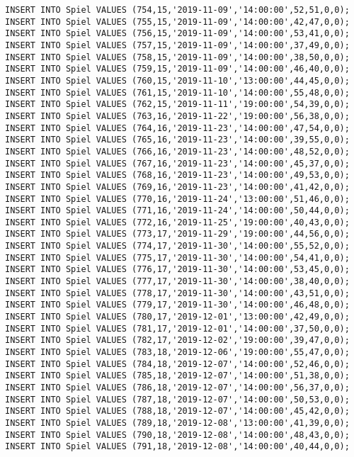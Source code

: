 \documentclass{lehramt-informatik-aufgabe}
\begin{document}
\begin{verbatim}
INSERT INTO Spiel VALUES (754,15,'2019-11-09','14:00:00',52,51,0,0);
INSERT INTO Spiel VALUES (755,15,'2019-11-09','14:00:00',42,47,0,0);
INSERT INTO Spiel VALUES (756,15,'2019-11-09','14:00:00',53,41,0,0);
INSERT INTO Spiel VALUES (757,15,'2019-11-09','14:00:00',37,49,0,0);
INSERT INTO Spiel VALUES (758,15,'2019-11-09','14:00:00',38,50,0,0);
INSERT INTO Spiel VALUES (759,15,'2019-11-09','14:00:00',46,40,0,0);
INSERT INTO Spiel VALUES (760,15,'2019-11-10','13:00:00',44,45,0,0);
INSERT INTO Spiel VALUES (761,15,'2019-11-10','14:00:00',55,48,0,0);
INSERT INTO Spiel VALUES (762,15,'2019-11-11','19:00:00',54,39,0,0);
INSERT INTO Spiel VALUES (763,16,'2019-11-22','19:00:00',56,38,0,0);
INSERT INTO Spiel VALUES (764,16,'2019-11-23','14:00:00',47,54,0,0);
INSERT INTO Spiel VALUES (765,16,'2019-11-23','14:00:00',39,55,0,0);
INSERT INTO Spiel VALUES (766,16,'2019-11-23','14:00:00',48,52,0,0);
INSERT INTO Spiel VALUES (767,16,'2019-11-23','14:00:00',45,37,0,0);
INSERT INTO Spiel VALUES (768,16,'2019-11-23','14:00:00',49,53,0,0);
INSERT INTO Spiel VALUES (769,16,'2019-11-23','14:00:00',41,42,0,0);
INSERT INTO Spiel VALUES (770,16,'2019-11-24','13:00:00',51,46,0,0);
INSERT INTO Spiel VALUES (771,16,'2019-11-24','14:00:00',50,44,0,0);
INSERT INTO Spiel VALUES (772,16,'2019-11-25','19:00:00',40,43,0,0);
INSERT INTO Spiel VALUES (773,17,'2019-11-29','19:00:00',44,56,0,0);
INSERT INTO Spiel VALUES (774,17,'2019-11-30','14:00:00',55,52,0,0);
INSERT INTO Spiel VALUES (775,17,'2019-11-30','14:00:00',54,41,0,0);
INSERT INTO Spiel VALUES (776,17,'2019-11-30','14:00:00',53,45,0,0);
INSERT INTO Spiel VALUES (777,17,'2019-11-30','14:00:00',38,40,0,0);
INSERT INTO Spiel VALUES (778,17,'2019-11-30','14:00:00',43,51,0,0);
INSERT INTO Spiel VALUES (779,17,'2019-11-30','14:00:00',46,48,0,0);
INSERT INTO Spiel VALUES (780,17,'2019-12-01','13:00:00',42,49,0,0);
INSERT INTO Spiel VALUES (781,17,'2019-12-01','14:00:00',37,50,0,0);
INSERT INTO Spiel VALUES (782,17,'2019-12-02','19:00:00',39,47,0,0);
INSERT INTO Spiel VALUES (783,18,'2019-12-06','19:00:00',55,47,0,0);
INSERT INTO Spiel VALUES (784,18,'2019-12-07','14:00:00',52,46,0,0);
INSERT INTO Spiel VALUES (785,18,'2019-12-07','14:00:00',51,38,0,0);
INSERT INTO Spiel VALUES (786,18,'2019-12-07','14:00:00',56,37,0,0);
INSERT INTO Spiel VALUES (787,18,'2019-12-07','14:00:00',50,53,0,0);
INSERT INTO Spiel VALUES (788,18,'2019-12-07','14:00:00',45,42,0,0);
INSERT INTO Spiel VALUES (789,18,'2019-12-08','13:00:00',41,39,0,0);
INSERT INTO Spiel VALUES (790,18,'2019-12-08','14:00:00',48,43,0,0);
INSERT INTO Spiel VALUES (791,18,'2019-12-08','14:00:00',40,44,0,0);

\end{verbatim}
\end{document}
